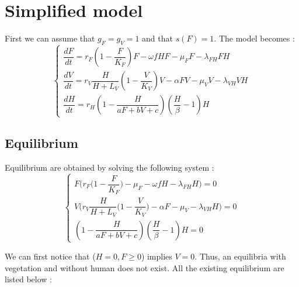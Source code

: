 \documentclass{article}
\newcommand{\lf}{\lambda_{FH}}
\newcommand{\lv}{\lambda_{VH}}
\begin{document}
\section{Simplified model}
First we can assume that $g_F = g_V = 1$ and that $s(F) = 1$. The model becomes :
\begin{equation}    
\left\{ \begin{array}{l}
\dfrac{dF}{dt}=r_{F}\left(1-\dfrac{F}{K_{F}}\right)F-\omega f H F - \mu_F F -\lf F H \\
\dfrac{dV}{dt}=r_V \dfrac{H}{H + L_V} \left(1-\dfrac{V}{K_{V}}\right)V -\alpha FV-\mu_V V -\lv V H\\
\dfrac{dH}{dt}=r_H \left(1-\dfrac{H}{aF + bV + c} \right)  (\dfrac{H}{\beta} - 1) H
\end{array}\right.
\label{model:simplified}
\end{equation}

\subsection{Equilibrium}
Equilibrium are obtained by solving the following system :
\begin{equation}    
\left\{ \begin{array}{l}
F\Big(r_{F}\big(1-\dfrac{F}{K_{F}}\big) - \mu_F -\omega f H -\lf H \Big) = 0\\
V \Big( r_V \dfrac{H}{H + L_V} \big(1-\dfrac{V}{K_{V}}\big) -\alpha F-\mu_V -\lv H\Big) = 0\\
\left(1-\dfrac{H}{aF + bV + c} \right)  (\dfrac{H}{\beta} - 1) H = 0
\end{array}\right.
\label{model:equilibrium}
\end{equation}

We can first notice that ($H=0, F\geq 0$) implies $V=0$. Thus, an equilibria with vegetation and without human does not exist. All the existing equilibrium are listed below :
\end{document}
